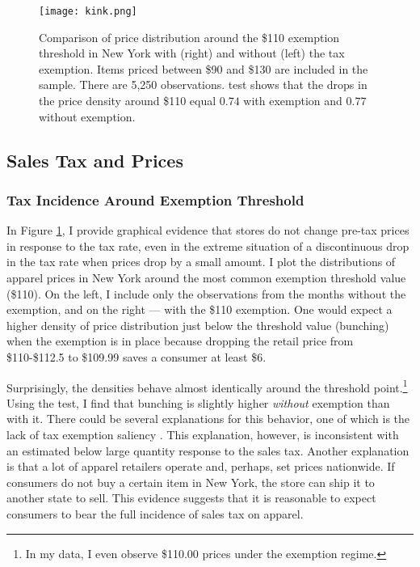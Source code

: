 \documentclass[12pt]{article}
\begin{document}
	
	
	
	
	
	\begin{figure}[t]
		\centering	\texttt{[image: kink.png]}
		\caption{Comparison of price distribution around the \$110 exemption threshold in New York with (right) and without (left) the tax exemption. Items priced between \$90 and \$130 are included in the sample. There are 5,250 observations. \citet{mccrary} test shows that the drops in the price density around \$110 equal $0.74$ with exemption and  $0.77$ without exemption.}
		\label{fig:kink}
	\end{figure}
	
	\subsection{Sales Tax and Prices}
	\subsubsection{Tax Incidence Around Exemption Threshold}
	
	In Figure \ref{fig:kink}, I provide graphical evidence that stores do not change pre-tax prices in response to the tax rate, even in the extreme situation of a discontinuous drop in the tax rate when prices drop by a small amount.  I plot the distributions of apparel prices in New York around the most common exemption threshold value (\$110). On the left, I include only the observations from the months without the exemption, and on the right --- with the \$110  exemption. One would expect a higher density of price distribution just below the threshold value (bunching) when the exemption is in place because dropping the retail price from \$110-\$112.5 to \$109.99 saves a consumer at least \$6.
	
	Surprisingly, the densities behave almost identically around the threshold point.\footnote{In my data, I even observe \$110.00 prices under the exemption regime.} Using the \citet{mccrary} test, I find that bunching is slightly higher \emph{without} exemption than with it. There could be several explanations for this behavior, one of which is the lack of tax exemption saliency \citep{chetty}. This explanation, however, is inconsistent with an estimated below large quantity response to the sales tax. Another explanation is that a lot of apparel retailers operate and, perhaps, set prices nationwide. If consumers do not buy a certain item in New York, the store can ship it to another state to sell. This evidence suggests that it is reasonable to expect consumers to bear the full incidence of sales tax on apparel.
	
\end{document}

